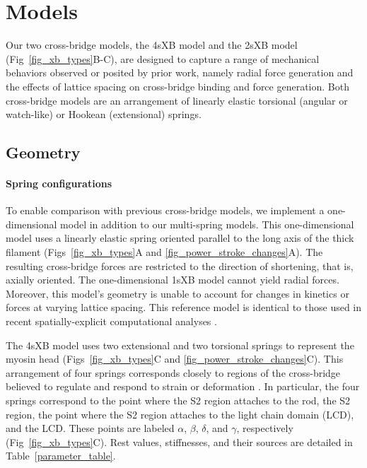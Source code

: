 \documentclass[10pt]{article}
\newcommand{\citep}[1]{\cite{#1}} %
\begin{document}


\section*{Models}  %

Our two cross-bridge models, the 4sXB model and the 2sXB model (Fig~\ref{fig_xb_types}B-C), are designed to capture a range of mechanical behaviors observed or posited by prior work, namely radial force generation and the effects of lattice spacing on cross-bridge binding and force generation.  
Both cross-bridge models are an arrangement of linearly elastic torsional (angular or watch-like) or Hookean (extensional) springs.  

\subsection*{Geometry} %

\paragraph{Spring configurations} %
To enable comparison with previous cross-bridge models, we implement a one-dimensional model in addition to our multi-spring models. 
This one-dimensional model uses a linearly elastic spring oriented parallel to the long axis of the thick filament (Figs~\ref{fig_xb_types}A and \ref{fig_power_stroke_changes}A).  
The resulting cross-bridge forces are restricted to the direction of shortening, that is, axially oriented. 
The one-dimensional 1sXB model cannot yield radial forces.
Moreover, this model's geometry is unable to account for changes in kinetics or forces at varying lattice spacing. 
This reference model is identical to those used in recent spatially-explicit computational analyses \citep{Daniel1998, Chase2004, Tanner2007}. 

The 4sXB model uses two extensional and two torsional springs to represent the myosin head (Figs~\ref{fig_xb_types}C and \ref{fig_power_stroke_changes}C).
This arrangement of four springs corresponds closely to regions of the cross-bridge believed to regulate and respond to strain or deformation \citep{Houdusse2001, Kohler2002}.
In particular, the four springs correspond to the point where the S2 region attaches to the rod, the S2 region, the point where the S2 region attaches to the light chain domain (LCD), and the LCD.
These points are labeled $\alpha$, $\beta$, $\delta$, and $\gamma$, respectively (Fig~\ref{fig_xb_types}C).
Rest values, stiffnesses, and their sources are detailed in Table~\ref{parameter_table}. 
\end{document}
